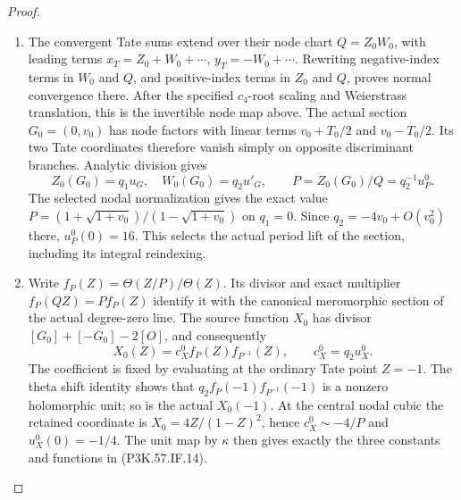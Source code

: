 \begin{proof}
\begin{enumerate}[label=\arabic*.]
\item The convergent Tate sums extend over their node chart
\(Q=Z_0W_0\), with leading terms
\(x_T=Z_0+W_0+\cdots\),
\(y_T=-W_0+\cdots\). Rewriting negative-index terms in
\(W_0\) and \(Q\), and positive-index terms in \(Z_0\)
and \(Q\), proves normal convergence there. After the
specified \(c_4\)-root scaling and Weierstrass translation,
this is the invertible node map above. The actual section
\(G_0=(0,v_0)\) has node factors with linear terms
\(v_0+T_0/2\) and \(v_0-T_0/2\). Its two Tate
coordinates therefore vanish simply on opposite
discriminant branches. Analytic division gives
\[
 Z_0(G_0)=q_1u_G,\quad W_0(G_0)=q_2u'_G,\qquad
 P=Z_0(G_0)/Q=q_2^{-1}u_P^0.                         \tag{P3K.57.IF.16b}
\]
The selected nodal normalization gives the exact value
\(P=(1+\sqrt{1+v_0})/(1-\sqrt{1+v_0})\) on
\(q_1=0\). Since \(q_2=-4v_0+O(v_0^2)\) there,
\(u_P^0(0)=16\). This selects the actual period lift
of the section, including its integral reindexing.

\item Write \(f_P(Z)=\Theta(Z/P)/\Theta(Z)\). Its divisor
and exact multiplier \(f_P(QZ)=P f_P(Z)\) identify
it with the canonical meromorphic section of the
actual degree-zero line. The source function \(X_0\)
has divisor \([G_0]+[-G_0]-2[O]\), and consequently
\[
 X_0(Z)=c_X^0 f_P(Z)f_{P^{-1}}(Z),\qquad
                     c_X^0=q_2u_X^0.                   \tag{P3K.57.IF.16c}
\]
The coefficient is fixed by evaluating at the ordinary
Tate point \(Z=-1\). The theta shift identity shows
that \(q_2f_P(-1)f_{P^{-1}}(-1)\) is a nonzero
holomorphic unit; so is the actual \(X_0(-1)\).
At the central nodal cubic the retained coordinate
is \(X_0=4Z/(1-Z)^2\), hence \(c_X^0\sim-4/P\)
and \(u_X^0(0)=-1/4\). The unit map by \(\kappa\)
then gives exactly the three constants and functions
in (P3K.57.IF.14).


\end{enumerate}
\end{proof}
